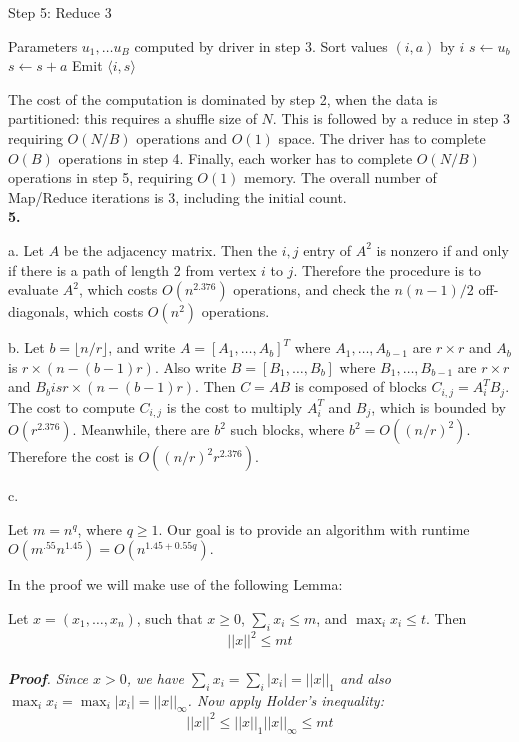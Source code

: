 \documentclass[11pt]{article}
\begin{document}
\begin{algorithm}[H]
\caption{Step 5: Reduce 3}
\begin{algorithmic}
\State Parameters $u_1,\hdots u_B$ computed by driver in step 3. 
  \State Sort values $(i, a)$ by $i$
  \State $s \leftarrow u_b$
    \State $s \leftarrow s + a$
    \State Emit $\langle i, s \rangle$
  \EndFor
\EndFunction
\end{algorithmic}
\end{algorithm}

The cost of the computation is dominated by step 2, when the data is
partitioned: this requires a shuffle size of $N$.  This is followed by
a reduce in step 3 requiring $O(N/B)$ operations and $O(1)$ space.
The driver has to complete $O(B)$ operations in step 4.  Finally, each
worker has to complete $O(N/B)$ operations in step 5, requiring $O(1)$
memory.  The overall number of Map/Reduce iterations is 3, including
the initial count.\\

\noindent\textbf{5.}

a. Let $A$ be the adjacency matrix.  Then the $i, j$ entry of $A^2$ is
nonzero if and only if there is a path of length 2 from vertex $i$ to
$j$.  Therefore the procedure is to evaluate $A^2$, which costs
$O(n^{2.376})$ operations, and check the $n(n-1)/2$ off-diagonals,
which costs $O(n^2)$ operations.

b. Let $b = \lfloor n/ r\rfloor$, and write $A = [A_1,\hdots, A_b]^T$
where $A_1, \hdots, A_{b-1}$ are $r \times r$ and $A_b$ is $r \times
(n - (b-1)r)$.  Also write $B = [B_1,\hdots, B_b]$ where $B_1,\hdots,
B_{b-1}$ are $r \times r$ and $B_b is r \times (n - (b-1)r)$.  Then $C
= AB$ is composed of blocks $C_{i,j} = A_i^T B_j$.  The cost to
compute $C_{i, j}$ is the cost to multiply $A_i^T$ and $B_j$, which is bounded by $O(r^{2.376})$.
Meanwhile, there are $b^2$ such blocks, where $b^2 = O((n/r)^2)$.
Therefore the cost is $O((n/r)^2 r^{2.376})$.

c.

Let $m = n^q$, where $q \geq 1$. Our goal is to provide an algorithm
with runtime $O(m^{.55} n^{1.45}) = O(n^{1.45 + 0.55q})$.

In the proof we will make use of the following Lemma:
\begin{lem}
Let $x = (x_1,\hdots, x_n)$, such that $x \geq 0$, $\sum_i x_i  \leq m$, 
and $\max_i x_i \leq t$.
Then
\[
||x||^2 \leq mt
\]\\
\emph{ \textbf{Proof}.  Since $x > 0$, we have $\sum_i x_i = \sum_i
  |x_i| = ||x||_1$ and also $\max_i x_i = \max_i |x_i| =
  ||x||_\infty$.  Now apply Holder's inequality:
\[
||x||^2 \leq ||x||_1 ||x||_\infty \leq mt
\]
}
\end{lem}
\end{document}
